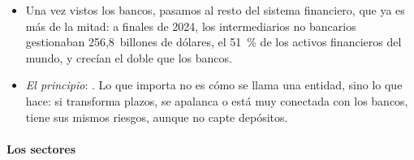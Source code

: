 \documentclass[11pt]{article}
\begin{document}
\begin{itemize}
\item Una vez vistos los bancos, pasamos al resto del sistema financiero, que ya es más de la mitad: a finales de 2024, los intermediarios no bancarios gestionaban 256,8~billones de dólares, el 51~\% de los activos financieros del mundo, y crecían el doble que los bancos\nocite{FSB2025NBFI}.
\item \emph{El principio}: . Lo que importa no es cómo se llama una entidad, sino lo que hace: si transforma plazos, se apalanca o está muy conectada con los bancos, tiene sus mismos riesgos, aunque no capte depósitos.
\end{itemize}

\paragraph{Los sectores}
\end{document}
